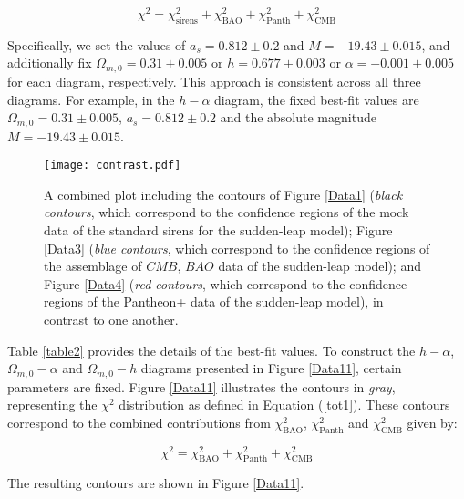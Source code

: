 \documentclass[universe,article,accept,moreauthors,pdftex]{Definitions/mdpi}
\begin{document}
\begin{equation}\label{tot}
\chi^{2}=\chi^{2}_{\text{sirens}}+\chi^{2}_{\text{BAO}}+\chi^{2}_{\text{Panth}}+\chi^{2}_{\text{CMB}}
\end{equation}


Specifically, we set the values of $a_s = 0.812 \pm 0.2$ and $M = -19.43 \pm 0.015$, and additionally fix $\Omega_{m,0} = 0.31 \pm 0.005$ or $h = 0.677 \pm 0.003$ or $\alpha = -0.001 \pm 0.005$ for each diagram, respectively. This  approach is consistent across all three diagrams. For example, in the $h-\alpha$ diagram, the fixed best-fit values are $\Omega_{m,0} = 0.31 \pm 0.005$, $a_s = 0.812 \pm 0.2$ and the absolute magnitude $M = -19.43 \pm 0.015$.
\begin{figure}[H] 
    \texttt{[image: contrast.pdf]}
    \caption{A combined plot including the contours of Figure \ref{Data1} (\textit{black contours}, which correspond to the confidence regions of the mock data of the standard sirens for the sudden-leap model); Figure \ref{Data3} (\textit{blue contours}, which correspond to the confidence regions of the assemblage of $CMB,\,BAO$ data of the sudden-leap model); and {Figure \ref{Data4}} %
 (\textit{red contours}, which correspond to the confidence regions of the Pantheon+ data of the sudden-leap model), in contrast to one another. }
    \label{Data6}
\end{figure}

 




Table \ref{table2} provides the details of the best-fit values. To construct the $h-\alpha$, $\Omega_{m,0}-\alpha$ and $\Omega_{m,0}-h$ diagrams presented in Figure \ref{Data11}, certain parameters are fixed. Figure \ref{Data11} illustrates the contours in \textit{gray}, representing the $\chi^2$ distribution as defined in Equation (\ref{tot1}). These contours correspond to the combined contributions from $\chi^2_{\text{BAO}}$, $\chi^2_{\text{Panth}}$ and $\chi^2_{\text{CMB}}$ given by:

\begin{equation}\label{tot1}
\chi^2 = \chi^2_{\text{BAO}} + \chi^2_{\text{Panth}} + \chi^2_{\text{CMB}}
\end{equation}


The resulting contours are shown in Figure \ref{Data11}. 
\end{document}
